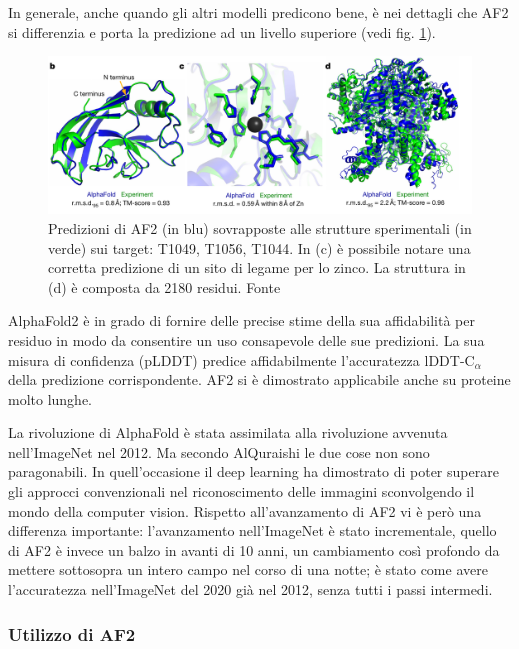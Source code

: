 In generale, anche quando gli altri modelli predicono bene, è nei dettagli che AF2 si differenzia e porta la predizione ad un livello superiore (vedi fig. \ref{fig:af2-details}).

\begin{figure}[!htb]
	\centering
	\includegraphics[scale=0.5]{images/af2-details.png}
	\caption{Predizioni di AF2 (in blu) sovrapposte alle strutture sperimentali (in verde) sui target: T1049, T1056, T1044. In (c) è possibile notare una corretta predizione di un sito di legame per lo zinco. La struttura in (d) è composta da 2180 residui. Fonte\cite{jumper2021highly}}
	\label{fig:af2-details}
\end{figure}

\par AlphaFold2 è in grado di fornire delle precise stime della sua affidabilità per residuo in modo da consentire un uso consapevole delle sue predizioni. La sua misura di confidenza (pLDDT) predice affidabilmente l'accuratezza lDDT-C$_{\alpha}$ della predizione corrispondente. AF2 si è dimostrato applicabile anche su proteine molto lunghe. 

\par La rivoluzione di AlphaFold è stata assimilata alla rivoluzione avvenuta nell'ImageNet nel 2012. Ma secondo AlQuraishi le due cose non sono paragonabili. In quell'occasione il deep learning ha dimostrato di poter superare gli approcci convenzionali nel riconoscimento delle immagini sconvolgendo il mondo della computer vision. Rispetto all'avanzamento di AF2 vi è però una differenza importante: l'avanzamento nell'ImageNet è stato incrementale, quello di AF2 è invece un balzo in avanti di 10 anni, un cambiamento così profondo da mettere sottosopra un intero campo nel corso di una notte; è stato come avere l'accuratezza nell'ImageNet del 2020 già nel 2012, senza tutti i passi intermedi.

\subsubsection{Utilizzo di AF2}

